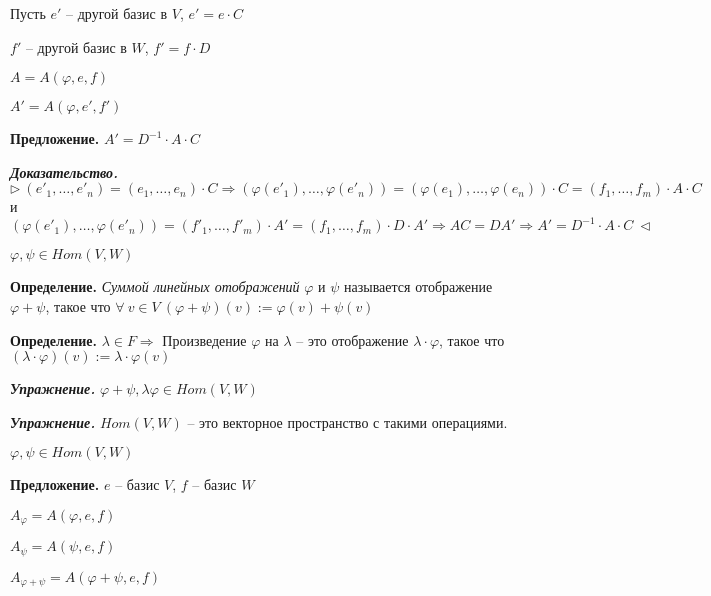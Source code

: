 \vspace{\baselineskip}
Пусть $e'$ -- другой базис в $V$, $e' = e \cdot C$

$f'$ -- другой базис в $W$, $f' = f \cdot D$

$A = A(\varphi, e, f)$

$A' = A(\varphi, e', f')$

\vspace{\baselineskip}
\textbf{Предложение.} $A' = D^{-1} \cdot A \cdot C$

\vspace{\baselineskip}
\textbf{\textit{Доказательство.}} $\rhd \ (e'_1, \dots, e'_n) = (e_1, \dots, e_n) \cdot C \Rightarrow (\varphi(e'_1), \dots, \varphi(e'_n)) = (\varphi(e_1), \dots, \varphi(e_n)) \cdot C = (f_1, \dots, f_m) \cdot A \cdot C$ и $(\varphi(e'_1), \dots, \varphi(e'_n)) = (f'_1, \dots, f'_m) \cdot A' = (f_1, \dots, f_m) \cdot D \cdot A' \Rightarrow AC = DA' \Rightarrow A' = D^{-1} \cdot A \cdot C \ \lhd$ 

\vspace{\baselineskip}
$\varphi, \psi \in Hom(V, W)$

\vspace{\baselineskip}
\textbf{Определение.} \textit{Суммой линейных отображений} $\varphi$ и $\psi$ называется отображение $\varphi + \psi$, такое что $\forall \ v \in V \ (\varphi + \psi) (v) := \varphi(v) + \psi(v)$ 

\vspace{\baselineskip}
\textbf{Определение.} $\lambda \in F \Rightarrow$ Произведение  $\varphi$ на $\lambda$ -- это отображение $\lambda \cdot \varphi$, такое что $(\lambda \cdot \varphi) (v) := \lambda \cdot \varphi (v)$

\vspace{\baselineskip}
\textbf{\textit{Упражнение.}} $\varphi + \psi, \lambda \varphi \in Hom(V, W)$

\vspace{\baselineskip}
\textbf{\textit{Упражнение.}} $Hom(V, W)$ -- это векторное пространство с такими операциями.

\vspace{\baselineskip}
$\varphi, \psi \in Hom(V, W)$

\textbf{Предложение.} $e$ -- базис $V$, $f$ -- базис $W$

$A_{\varphi} = A(\varphi, e, f)$

$A_{\psi} = A(\psi, e, f)$

$A_{\varphi + \psi} = A(\varphi + \psi, e, f)$

